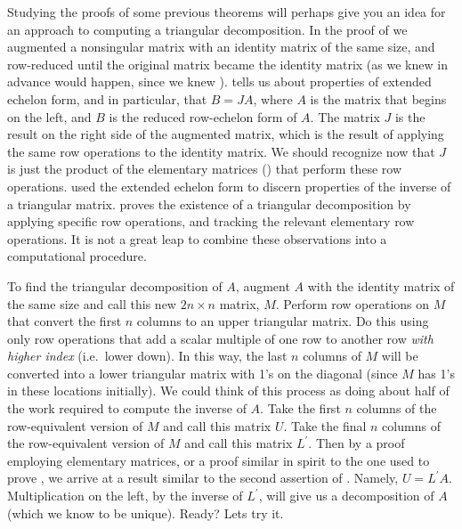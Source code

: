%
Studying the proofs of some previous theorems will perhaps give you an idea for an approach to computing a triangular decomposition.  In the proof of  we augmented a nonsingular matrix with an identity matrix of the same size, and row-reduced until the original matrix became the identity matrix (as we knew in advance would happen, since we knew ).   tells us about properties of extended echelon form, and in particular, that $B=JA$, where $A$ is the matrix that begins on the left, and $B$ is the reduced row-echelon form of $A$.  The matrix $J$ is the result on the right side of the augmented matrix, which is the result of applying the same row operations to the identity matrix.  We should recognize now that $J$ is just the product of the elementary matrices () that perform these row operations.   used the extended echelon form to discern properties of the inverse of a triangular matrix.   proves the existence of a triangular decomposition by applying specific row operations, and tracking the relevant elementary row operations.  It is not a great leap to combine these observations into a computational procedure.\par
%
To find the triangular decomposition of $A$, augment $A$ with the identity matrix of the same size and call this new $2n\times n$ matrix, $M$.  Perform row operations on $M$ that convert the first $n$ columns to an upper triangular matrix.  Do this using only row operations that add a scalar multiple of one row to another row {\em with higher index} (i.e.\ lower down).  In this way, the last $n$ columns of $M$ will be converted into a lower triangular matrix with 1's on the diagonal (since $M$ has 1's in these locations initially).  We could think of this process as doing about half of the work required to compute the inverse of $A$.  Take the first $n$ columns of the row-equivalent version of $M$ and call this matrix $U$.  
Take the final $n$ columns of the row-equivalent version of $M$ and call this matrix $L^\prime$.  Then by a proof employing elementary matrices, or a proof similar in spirit to the one used to prove , we arrive at a result similar to the second assertion of .  Namely, $U=L^\prime A$.  Multiplication on the left, by the inverse of $L^\prime$, will give us a decomposition of $A$ (which we know to be unique).  Ready? Lets try it.
%
%
